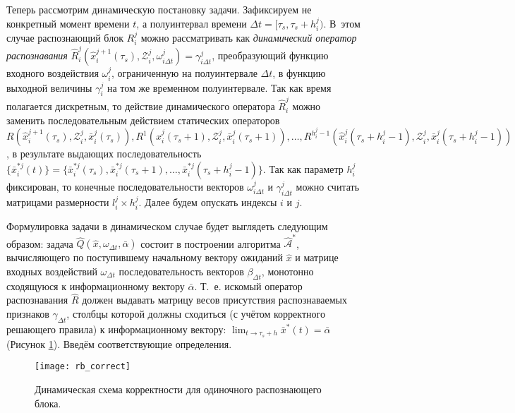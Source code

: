 Теперь рассмотрим динамическую постановку задачи. Зафиксируем не конкретный момент времени $t$, а полуинтервал времени ${\Delta}t=[\tau_s,\tau_s+h_i^j)$. В~этом случае распознающий блок $R_i^j$ можно рассматривать как \textit{динамический оператор распознавания} $\hat{R}_i^j(\hat{x}_i^{j+1}(\tau_s), \mathcal{Z}_i^j, \omega_{i\Delta{t}}^j)=\gamma_{i\Delta{t}}^j$, преобразующий  функцию входного воздействия $\omega_i^j$, ограниченную на полуинтервале ${\Delta}t$, в функцию выходной величины $\gamma_i^j$ на том же временном полуинтервале. Так как время полагается дискретным, то действие динамического оператора $\hat{R}_i^j$ можно заменить последовательным действием статических операторов $R(\hat{x}_i^{j+1}(\tau_s), \mathcal{Z}_i^j, \bar{x}_i^j(\tau_s)), R^1(\hat{x}_i^j(\tau_s+1), \mathcal{Z}_i^j, \bar{x}_i^j(\tau_s+1)), \dots, R^{h_i^j-1}(\hat{x}_i^j(\tau_s+h_i^j-1), \mathcal{Z}_i^j, \bar{x}_i^j(\tau_s+h_i^j-1))$, в результате выдающих последовательность $\{\bar{x}_i^{*j}(t)\}=\{\bar{x}_i^{*j}(\tau_s), \bar{x}_i^{*j}(\tau_s+1), \dots, \bar{x}_i^{*j}(\tau_s+h_i^j-1)\}$. Так как параметр $h_i^j$ фиксирован, то конечные последовательности векторов  $\omega_{i\Delta{t}}^j$ и $\gamma_{i\Delta{t}}^j$ можно считать матрицами размерности $l_i^j\times{h_i^j}$. Далее будем опускать индексы $i$ и $j$.
	
Формулировка задачи в динамическом случае будет выглядеть следующим образом: задача $\hat{Q}(\hat{x}, \omega_{{\Delta}t}, \bar{\alpha})$ состоит в построении алгоритма $\hat{\mathcal A}^*$, вычисляющего по поступившему начальному вектору ожиданий $\hat{x}$ и матрице входных воздействий $\omega_{{\Delta}t}$  последовательность векторов $\beta_{\Delta{t}}$, монотонно сходящуюся к информационному вектору $\bar{\alpha}$. Т.~е. искомый оператор распознавания $\hat{R}$ должен выдавать матрицу весов присутствия распознаваемых признаков $\gamma_{\Delta{t}}$, столбцы которой должны сходиться (с учётом корректного решающего правила) к информационному вектору: $\lim_{t\to\tau_s+h}\bar{x}^*(t)=\bar{\alpha}$ (Рисунок \ref{fig:rb_correct_dyn}). Введём соответствующие определения.
	
\begin{figure}[h]
	\centering
	\texttt{[image: rb\_correct]}
	\caption{Динамическая схема корректности для одиночного распознающего блока.}
	\label{fig:rb_correct_dyn}
\end{figure}
	
